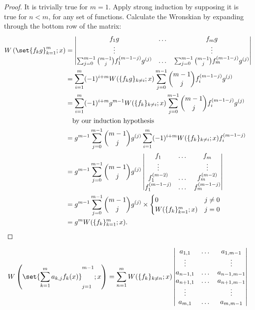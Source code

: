\documentclass{book}
\begin{document}
\begin{proof}
It is trivially true for $m=1$.
Apply strong induction by supposing it is true for $n<m$, for any set of functions.
Calculate the Wronskian by expanding through the bottom row of the matrix:
\begin{align*}
\W{\set{f_k g}_{k=1}^m}{x}
& = \begin{vmatrix}
f_1 g & \dots & f_m g \\
\vdots & & \vdots \\
\sum_{j=0}^{m-1} \binom{m-1}{j} f_1^{(m-1-j)} g^{(j)}
& \dots & \sum_{j=0}^{m-1} \binom{m-1}{j} f_m^{(m-1-j)} g^{(j)}
\end{vmatrix} \\
& = \sum_{i=1}^m (-1)^{i+m} W(\{f_k g\}_{k \neq i} ; x) \sum_{j=0}^{m-1} \binom{m-1}{j} f_i^{(m-1-j)} g^{(j)} \\
& = \sum_{i=1}^m (-1)^{i+m} g^{m-1} W(\{ f_k \}_{k \neq i} ; x) \sum_{j=0}^{m-1} \binom{m-1}{j} f_i^{(m-1-j)} g^{(j)} \\
& \quad \text{by our induction hypothesis} \\
& = g^{m-1} \sum_{j=0}^{m-1} \binom{m-1}{j} g^{(j)}
\sum_{i=1}^m (-1)^{i+m} W(\{f_k\}_{k\neq i} ; x) f_i^{(m-1-j)} \\
& = g^{m-1} \sum_{j=0}^{m-1} \binom{m-1}{j} g^{(j)}
\begin{vmatrix} f_1 & \dots & f_m \\
\vdots & & \vdots \\
f_1^{(m-2)} & \dots & f_m^{(m-2)} \\
f_1^{(m-1-j)} & \dots & f_m^{(m-1-j)} \end{vmatrix} \\
& = g^{m-1} \sum_{j=0}^{m-1} \binom{m-1}{j} g^{(j)} \times \begin{cases} 0 & j\neq 0 \\
W(\{f_k\}_{k=1}^m ; x) & j = 0 \end{cases} \\
& = g^m W(\{f_k\}_{k=1}^m ; x) .
\end{align*}
\end{proof}

\begin{lemma} %
\begin{equation*}
\W{ \set{ \sum_{k=1}^m a_{k,j} f_k(x) }_{j=1}^{m-1} }{ x} = \sum_{n=1}^m W(\{f_k\}_{k\neq n} ; x) \begin{vmatrix}
a_{1,1} & \dots & a_{1,m-1} \\
\vdots & & \vdots \\
a_{n-1,1} & \dots & a_{n-1,m-1} \\
a_{n+1,1} & \dots & a_{n+1,m-1} \\
\vdots & & \vdots \\
a_{m,1} & \dots & a_{m,m-1}
\end{vmatrix}
\end{equation*}
\label{lem:sum}
\end{lemma}
\end{document}
